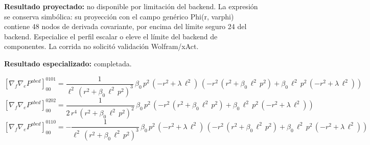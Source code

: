 \documentclass[11pt]{article}
\begin{document}
\textbf{Resultado proyectado:} no disponible por limitación del backend. La expresión se conserva simbólica: su proyección con el campo genérico Phi(r, varphi) contiene 48 nodos de derivada covariante, por encima del límite seguro 24 del backend. Especialice el perfil escalar o eleve el límite del backend de componentes. La corrida no solicitó validación Wolfram/xAct.\par
\textbf{Resultado especializado:} completada.\par
\begin{dmath*}[breakdepth={5}]
\left[\nabla_f\nabla_e P^{abcd}\right]_{00}^{0101} = \frac{1}{{\ell}^{2}\,{\left({r}^{2} + \beta_{0}\,{\ell}^{2}\,{p}^{2}\right)}^{3}}\,\beta_{0}\,{p}^{2}\,\left(-{r}^{2} + \lambda\,{\ell}^{2}\right)\,\left(-{r}^{2}\,\left({r}^{2} + \beta_{0}\,{\ell}^{2}\,{p}^{2}\right) + \beta_{0}\,{\ell}^{2}\,{p}^{2}\,\left(-{r}^{2} + \lambda\,{\ell}^{2}\right)\right)
\end{dmath*}
\begin{dmath*}[breakdepth={5}]
\left[\nabla_f\nabla_e P^{abcd}\right]_{00}^{0202} = \frac{1}{2\,{r}^{4}\,{\left({r}^{2} + \beta_{0}\,{\ell}^{2}\,{p}^{2}\right)}^{2}}\,\beta_{0}\,{p}^{2}\,\left(-{r}^{2}\,\left({r}^{2} + \beta_{0}\,{\ell}^{2}\,{p}^{2}\right) + \beta_{0}\,{\ell}^{2}\,{p}^{2}\,\left(-{r}^{2} + \lambda\,{\ell}^{2}\right)\right)
\end{dmath*}
\begin{dmath*}[breakdepth={5}]
\left[\nabla_f\nabla_e P^{abcd}\right]_{00}^{0110} = -\frac{1}{{\ell}^{2}\,{\left({r}^{2} + \beta_{0}\,{\ell}^{2}\,{p}^{2}\right)}^{3}}\,\beta_{0}\,{p}^{2}\,\left(-{r}^{2} + \lambda\,{\ell}^{2}\right)\,\left(-{r}^{2}\,\left({r}^{2} + \beta_{0}\,{\ell}^{2}\,{p}^{2}\right) + \beta_{0}\,{\ell}^{2}\,{p}^{2}\,\left(-{r}^{2} + \lambda\,{\ell}^{2}\right)\right)
\end{dmath*}
\end{document}
